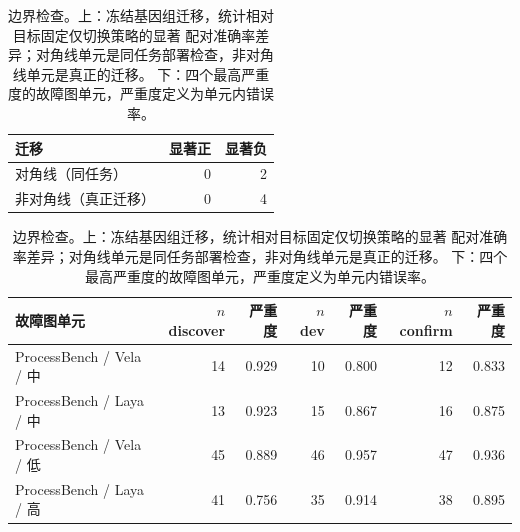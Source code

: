 \begin{table}[t]
\centering
\small
\caption{边界检查。上：冻结基因组迁移，统计相对目标固定仅切换策略的显著
配对准确率差异；对角线单元是同任务部署检查，非对角线单元是真正的迁移。
下：四个最高严重度的故障图单元，严重度定义为单元内错误率。}
\label{tab:boundary}
\begin{tabular}{@{}lrr@{}}
\toprule
迁移 & 显著正 & 显著负 \\
\midrule
对角线（同任务） & 0 & 2 \\
非对角线（真正迁移） & 0 & 4 \\
\bottomrule
\end{tabular}

\vspace{4pt}
\begin{tabular}{@{}lrrrrrr@{}}
\toprule
故障图单元 & $n$ discover & 严重度 & $n$ dev & 严重度 & $n$ confirm & 严重度 \\
\midrule
ProcessBench / Vela / 中 & 14 & 0.929 & 10 & 0.800 & 12 & 0.833 \\
ProcessBench / Laya / 中 & 13 & 0.923 & 15 & 0.867 & 16 & 0.875 \\
ProcessBench / Vela / 低 & 45 & 0.889 & 46 & 0.957 & 47 & 0.936 \\
ProcessBench / Laya / 高 & 41 & 0.756 & 35 & 0.914 & 38 & 0.895 \\
\bottomrule
\end{tabular}
\end{table}
